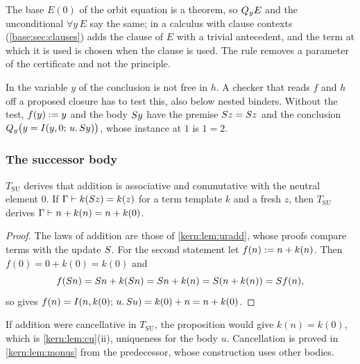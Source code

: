 The base $E(0)$ of the orbit equation is a theorem, so $Q_{y}E$ and the
unconditional $\forall y\,E$ say the same; in a calculus with clause
contexts (\cref{base:sec:clauses})  adds the clause of $E$
with a trivial antecedent, and the term at which it is used is chosen when
the clause is used.  The rule removes a parameter of the certificate and
not the principle.

\begin{remark}
\label{kern:rem:orbcounter}
In  the variable $y$ of the conclusion is not free in $h$.
A checker that reads $f$ and $h$ off a proposed closure has to test this,
also below nested binders.  Without the test, $f(y)\mathrel{:=} y$ and the body
$S y$ have the premise $S z=S z$ and the conclusion
$Q_{y}\bigl(y=I(y,0;\,u.\,S y)\bigr)$, whose instance at $1$ is
$1=2$.
\end{remark}

\subsubsection*{The successor body}

\begin{proposition}
\label{kern:prop:suadd}
$T_{\mathrm{SU}}$ derives that addition is associative and commutative with
the neutral element $0$.  If $\Gamma\vdash k(S z)=k(z)$ for a term
template $k$ and a fresh $z$, then $T_{\mathrm{SU}}$ derives
$\Gamma\vdash n+k(n)=n+k(0)$.
\end{proposition}

\begin{proof}
The laws of addition are those of \cref{kern:lem:uradd}, whose proofs
compare terms with the update $S$.  For the second statement let
$f(n)\mathrel{:=} n+k(n)$.  Then $f(0)=0+k(0)=k(0)$ and
\[
 f(S n)=S n+k(S n)=S n+k(n)=S(n+k(n))=S f(n),
\]
so  gives $f(n)=I(n,k(0);\,u.\,S u)=k(0)+n=n+k(0)$.
\end{proof}

If addition were cancellative in $T_{\mathrm{SU}}$, the proposition would
give $k(n)=k(0)$, which is \cref{kern:lem:cu}(ii), uniqueness for the body
$u$.  Cancellation is proved in \cref{kern:lem:monus} from the predecessor,
whose construction uses other bodies.

